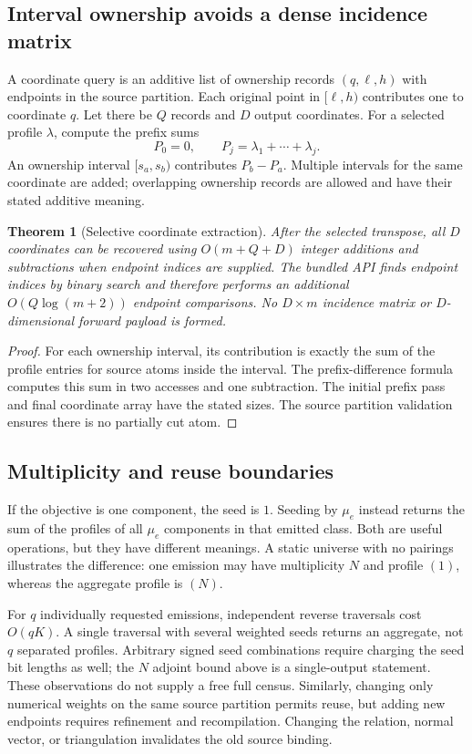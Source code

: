 \documentclass[11pt]{article}
\newtheorem{theorem}{Theorem}[section]
\theoremstyle{definition}\newtheorem{definition}[theorem]{Definition}
\theoremstyle{remark}\newtheorem{remark}[theorem]{Remark}
\begin{document}
\subsection{Interval ownership avoids a dense incidence matrix}
A coordinate query is an additive list of ownership records
$(q,\ell,h)$ with endpoints in the source partition. Each original point in
$[\ell,h)$ contributes one to coordinate $q$. Let there be $Q$ records and $D$
output coordinates. For a selected profile $\lambda$, compute the prefix sums
\[
 P_0=0,\qquad P_j=\lambda_1+\cdots+\lambda_j.
\]
An ownership interval $[s_a,s_b)$ contributes $P_b-P_a$. Multiple intervals
for the same coordinate are added; overlapping ownership records are allowed
and have their stated additive meaning.

\begin{theorem}[Selective coordinate extraction]
\label{thm:ownership}
After the selected transpose, all $D$ coordinates can be recovered using
$O(m+Q+D)$ integer additions and subtractions when endpoint indices are supplied.
The bundled API finds endpoint indices by binary search and therefore performs
an additional $O(Q\log(m+2))$ endpoint comparisons. No $D\times m$ incidence
matrix or $D$-dimensional forward payload is formed.
\end{theorem}
\begin{proof}
For each ownership interval, its contribution is exactly the sum of the profile
entries for source atoms inside the interval. The prefix-difference formula
computes this sum in two accesses and one subtraction. The initial prefix pass
and final coordinate array have the stated sizes. The source partition validation
ensures there is no partially cut atom.
\end{proof}

\subsection{Multiplicity and reuse boundaries}
If the objective is one component, the seed is $1$. Seeding by $\mu_e$ instead
returns the sum of the profiles of all $\mu_e$ components in that emitted class.
Both are useful operations, but they have different meanings. A static universe
with no pairings illustrates the difference: one emission may have multiplicity
$N$ and profile $(1)$, whereas the aggregate profile is $(N)$.

For $q$ individually requested emissions, independent reverse traversals cost
$O(qK)$. A single traversal with several weighted seeds returns an aggregate,
not $q$ separated profiles. Arbitrary signed seed combinations require charging
the seed bit lengths as well; the $N$ adjoint bound above is a single-output
statement. These observations do not supply a free full census.
Similarly, changing only numerical weights on the same source partition permits
reuse, but adding new endpoints requires refinement and recompilation. Changing
the relation, normal vector, or triangulation invalidates the old source binding.
\end{document}
